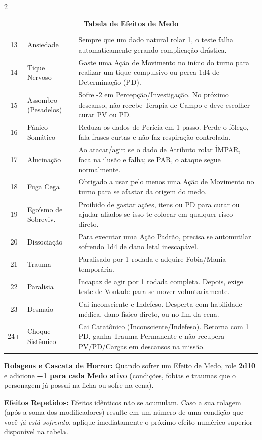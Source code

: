 \documentclass[a4paper,11pt,openany]{book}
\begin{document}
\begin{multicols}{2}
\begin{table}[t]
\begin{tabularx}{\textwidth}{c l X}
13 & Ansiedade & Sempre que um dado natural rolar 1, o teste falha automaticamente gerando complicação drástica. \\
14 & Tique Nervoso & Gaste uma Ação de Movimento no início do turno para realizar um tique compulsivo ou perca 1d4 de Determinação (PD). \\
15 & Assombro (Pesadelos) & Sofre -2 em Percepção/Investigação. No próximo descanso, não recebe Terapia de Campo e deve escolher curar PV ou PD. \\
16 & Pânico Somático & Reduza os dados de Perícia em 1 passo. Perde o fôlego, fala frases curtas e não faz respiração controlada. \\
17 & Alucinação & Ao atacar/agir: se o dado de Atributo rolar ÍMPAR, foca na ilusão e falha; se PAR, o ataque segue normalmente. \\
18 & Fuga Cega & Obrigado a usar pelo menos uma Ação de Movimento no turno para se afastar da origem do medo. \\
19 & Egoísmo de Sobreviv. & Proibido de gastar ações, itens ou PD para curar ou ajudar aliados se isso te colocar em qualquer risco direto. \\
20 & Dissociação & Para executar uma Ação Padrão, precisa se automutilar sofrendo 1d4 de dano letal inescapável. \\
21 & Trauma & Paralisado por 1 rodada e adquire Fobia/Mania temporária. \\
22 & Paralisia & Incapaz de agir por 1 rodada completa. Depois, exige teste de Vontade para se mover voluntariamente. \\
23 & Desmaio & Cai inconsciente e Indefeso. Desperta com habilidade médica, dano físico direto, ou no fim da cena. \\
24+ & Choque Sistêmico & Cai Catatônico (Inconsciente/Indefeso). Retorna com 1 PD, ganha Trauma Permanente e não recupera PV/PD/Cargas em descansos na missão. \\
\bottomrule
\end{tabularx}
\caption{\textbf{Tabela de Efeitos de Medo}}
\end{table}

\begin{regra}
\textbf{Rolagens e Cascata de Horror:} Quando sofrer um Efeito de Medo, role \textbf{2d10} e adicione \textbf{+1 para cada Medo ativo} (condições, fobias e traumas que o personagem já possui na ficha ou sofre na cena).

\textbf{Efeitos Repetidos:} Efeitos idênticos não se acumulam. Caso a sua rolagem (após a soma dos modificadores) resulte em um número de uma condição que você \textit{já está sofrendo}, aplique imediatamente o próximo efeito numérico superior disponível na tabela. 
\end{regra}


\end{multicols}
\end{document}
